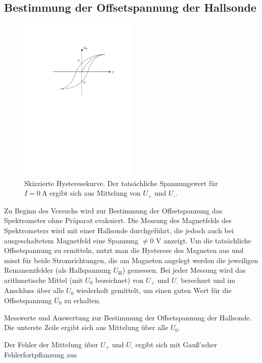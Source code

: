 \documentclass[11pt, a4paper]{article}
\numberwithin{equation}{section}
\begin{document}
\subsection{Bestimmung der Offsetspannung der Hallsonde}
\label{ssec:offsetspannung}
\begin{figure}
	\centering
	\includegraphics[width=0.5\textwidth]{./figures/hysterese.pdf}
	\caption{Skizzierte Hysteresekurve. Der tatsächliche Spannungswert für $I=\SI{0}{\ampere}$ ergibt sich aus Mittelung von $U_\text{+}$ und $U_\text{-}$.}
	\label{fig:hysterese}
\end{figure}
Zu Beginn des Versuchs wird zur Bestimmung der Offsetspannung das Spektrometer ohne Präparat evakuiert.
Die Messung des Magnetfelds des Spektrometers wird mit einer Hallsonde durchgeführt, die jedoch auch bei ausgeschaltetem Magnetfeld eine Spannung $\neq 0$ \si{\volt} anzeigt.
Um die tatsächliche Offsetspannung zu ermitteln, nutzt man die Hysterese des Magneten aus und misst für beide Stromrichtungen, die am Magneten angelegt werden die jeweiligen Remanenzfelder (als Hallspannung $U_\text{H}$) gemessen.
Bei jeder Messung wird das arithmetische Mittel (mit $U_0$ bezeichnet) von $U_\text{+}$ und $U_\text{-}$ berechnet und im Anschluss über alle $U_0$ wiederholt gemittelt, um einen guten Wert für die Offsetspannung $\overline{U_0}$ zu erhalten.
\begin{table}[h]
	\centering
	
	\caption{Messwerte und Auswertung zur Bestimmung der Offsetspannung der Hallsonde. Die unterste Zeile ergibt sich aus Mittelung über alle $U_0$.}
	\label{tab:offset}
\end{table}
Der Fehler der Mittelung über $U_\text{+}$ und $U_\text{-}$ ergibt sich mit Gauß'scher Fehlerfortpflanzung aus
\end{document}

